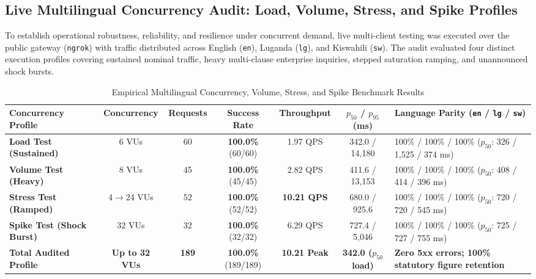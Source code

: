 \documentclass[10pt,a4paper]{article}
\begin{document}
\subsection{Live Multilingual Concurrency Audit: Load, Volume, Stress, and Spike Profiles}

To establish operational robustness, reliability, and resilience under concurrent demand, live multi-client testing was executed over the public gateway (\texttt{ngrok}) with traffic distributed across English (\texttt{en}), Luganda (\texttt{lg}), and Kiswahili (\texttt{sw}). The audit evaluated four distinct execution profiles covering sustained nominal traffic, heavy multi-clause enterprise inquiries, stepped saturation ramping, and unannounced shock bursts.

\begin{table}[h!]
\centering
\small
\begin{tabularx}{\textwidth}{p{32mm} c c c c c X}
\toprule
\textbf{Concurrency Profile} & \textbf{Concurrency} & \textbf{Requests} & \textbf{Success Rate} & \textbf{Throughput} & \textbf{$p_{50}$ / $p_{95}$ (ms)} & \textbf{Language Parity (\texttt{en} / \texttt{lg} / \texttt{sw})} \\
\midrule
\textbf{Load Test (Sustained)} & 6 VUs & 60 & \textbf{100.0\%} (60/60) & 1.97 QPS & 342.0 / 14,180 & 100\% / 100\% / 100\% ($p_{50}$: 326 / 1,525 / 374 ms) \\
\textbf{Volume Test (Heavy)} & 8 VUs & 45 & \textbf{100.0\%} (45/45) & 2.82 QPS & 411.6 / 13,153 & 100\% / 100\% / 100\% ($p_{50}$: 408 / 414 / 396 ms) \\
\textbf{Stress Test (Ramped)} & 4$\to$24 VUs & 52 & \textbf{100.0\%} (52/52) & \textbf{10.21 QPS} & 680.0 / 925.6 & 100\% / 100\% / 100\% ($p_{50}$: 720 / 720 / 545 ms) \\
\textbf{Spike Test (Shock Burst)} & 32 VUs & 32 & \textbf{100.0\%} (32/32) & 6.29 QPS & 727.4 / 5,046 & 100\% / 100\% / 100\% ($p_{50}$: 725 / 727 / 755 ms) \\
\midrule
\textbf{Total Audited Profile} & \textbf{Up to 32 VUs} & \textbf{189} & \textbf{100.0\%} (189/189) & \textbf{10.21 Peak} & \textbf{342.0 ($p_{50}$ load)} & \textbf{Zero 5xx errors; 100\% statutory figure retention} \\
\bottomrule
\end{tabularx}
\caption{Empirical Multilingual Concurrency, Volume, Stress, and Spike Benchmark Results}
\end{table}
\end{document}
